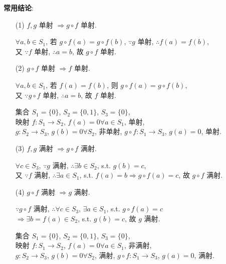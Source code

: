 \documentclass{note}
\begin{document}
\textbf{常用结论}:
\begin{itemize}
    \item[(1)] $f,g$ 单射 $\Longrightarrow g\circ f$ 单射.
    \begin{pf}
        $\forall a,b\in S_1$, 若 $g\circ f(a)=g\circ f(b)$, $\because g$ 单射, $\therefore f(a)=f(b)$,\\
        又 $\because f$ 单射, $\therefore a=b$, 故 $g\circ f$ 单射.
    \end{pf}
    \item[(2)] $g\circ f$ 单射 $\Longrightarrow f$ 单射.
    \begin{pf}
        $\forall a,b\in S_1$, 若 $f(a)=f(b)$, 则 $g\circ f(a)=g\circ f(b)$,\\
        又 $\because g\circ f$ 单射, $\therefore a=b$, 故 $f$ 单射.
    \end{pf}

    \begin{eg}
        集合 $S_1=\{0\}$, $S_2=\{0,1\}$, $S_3=\{0\}$,\\
        映射 $f:S_1\rightarrow S_2$, $f(a)=0\forall a\in S_1$, 单射,\\
        $g:S_2\rightarrow S_3$, $g(b)=0\forall S_2$, 非单射,
        $g\circ f:S_1\rightarrow S_3$, $g(a)=0$, 单射.
    \end{eg}
    \item[(3)] $f,g$ 满射 $\Longrightarrow g\circ f$ 满射.
    \begin{pf}
        $\forall c\in S_3$, $\because g$ 满射, $\therefore\exists b\in S_2$, s.t. $g(b)=c$,\\
        又 $\because f$ 满射, $\therefore\exists a\in S_1$, s.t. $f(a)=b\Longrightarrow g\circ f(a)=c$, 故 $g\circ f$ 满射.
    \end{pf}
    \item[(4)] $g\circ f$ 满射 $\Longrightarrow g$ 满射.
    \begin{pf}
        $\because g\circ f$ 满射, $\therefore\forall c\in S_3$, $\exists a\in S_1$, s.t. $g\circ f(a)=c$\\
        $\Longrightarrow\exists b=f(a)\in S_2$, s.t. $g(b)=c$, 故 $g$ 满射.
    \end{pf}

    \begin{eg}
        集合 $S_1=\{0\}$, $S_2=\{0,1\}$, $S_3=\{0\}$,\\
        映射 $f:S_1\rightarrow S_2$, $f(a)=0\forall a\in S_1$, 非满射,\\
        $g:S_2\rightarrow S_3$, $g(b)=0\forall S_2$, 满射,
        $g\circ f:S_1\rightarrow S_3$, $g(a)=0$, 满射.
    \end{eg}
\end{itemize}
\end{document}
